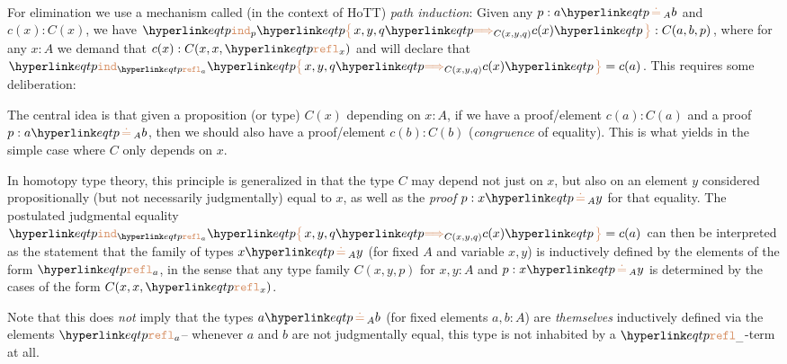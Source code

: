 \paragraph{} For elimination we use a mechanism called (in the context of HoTT) \emph{path induction}: Given any $p:\eqtp abA$ and $c(x):C(x)$, we have $\eqind pxyq{C(x,y,q)}{c(x)}:C(a,b,p)$, where for any $x:A$ we demand that $c(x):C(x,x,\refl x)$ and will declare that $\eqind{\refl a}xyq{C(x,y,q)}{c(x)}=c(a)$. This requires some deliberation:

The central idea is that given a proposition (or type) $C(x)$ depending on $x:A$, if we have a proof/element $c(a):C(a)$ and a proof $p:\eqtp abA$, then we should also have a proof/element $c(b):C(b)$ (\emph{congruence} of equality). This is what \eqindsym yields in the simple case where $C$ only depends on $x$.

In homotopy type theory, this principle is generalized in that the type $C$ may depend not just on $x$, but also on an element $y$ considered propositionally (but not necessarily judgmentally) equal to $x$, as well as the \emph{proof} $p:\eqtp xyA$ for that equality. The postulated judgmental equality $\eqind{\refl a}xyq{C(x,y,q)}{c(x)}=c(a)$ can then be interpreted as the statement that the family of types $\eqtp xyA$ (for fixed $A$ and variable $x,y$) is inductively defined by the elements of the form $\refl a$, in the sense that any type family $C(x,y,p)$ for $x,y:A$ and $p:\eqtp xyA$ is determined by the cases of the form $C(x,x,\refl x)$. 

Note that this does \emph{not} imply that the types $\eqtp abA$ (for fixed elements $a,b:A$) are \emph{themselves} inductively defined via the elements $\refl a$-- whenever $a$ and $b$ are not judgmentally equal, this type is not inhabited by a $\refl\_$-term at all.

